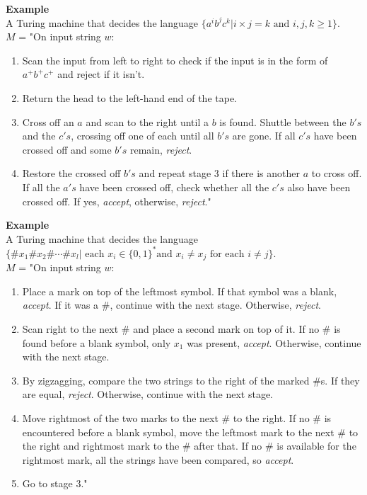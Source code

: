 \documentclass[11pt]{article}
\begin{document}
\begin{mdframed}[backgroundcolor=light-blue]
\textbf{Example}\\
A Turing machine that decides the language $\{a^ib^jc^k|i \times j=k
\text{ and } i,j,k \geq 1\}$.\\
$M$ = "On input string $w$:
\begin{enumerate}
\item Scan the input from left to right to check if the input is in
  the form of $a^+b^+c^+$ and reject if it isn't.
\item Return the head to the left-hand end of the tape.
\item Cross off an $a$ and scan to the right until a $b$ is
  found. Shuttle between the $b's$ and the $c's$, crossing off one of
  each until all $b's$ are gone. If all $c's$ have been crossed off
  and some $b's$ remain, \emph{reject}.
\item Restore the crossed off $b's$ and repeat stage 3 if there is
  another $a$ to cross off. If all the $a's$ have been crossed off,
  check whether all the $c's$ also have been crossed off. If yes,
  \emph{accept}, otherwise, \emph{reject}."
\end{enumerate}
\end{mdframed}

\begin{mdframed}[backgroundcolor=light-blue]
\textbf{Example}\\
A Turing machine that decides the language\\
$\{\#x_1\#x_2\#\cdots\#x_l | \text{ each } x_i \in \{0,1\}^* \text{
  and } x_i \neq x_j \text{ for each } i \neq j \}$.\\
$M$ = "On input string $w$:
\begin{enumerate}
\item Place a mark on top of the leftmost symbol. If that symbol was a
  blank, \emph{accept}. If it was a \#, continue with the next
  stage. Otherwise, \emph{reject}.
\item Scan right to the next \# and place a second mark on top of
  it. If no \# is found before a blank symbol, only $x_1$ was present,
  \emph{accept}. Otherwise, continue with the next stage.
\item By zigzagging, compare the two strings to the right of the marked
  \#s. If they are equal, \emph{reject}. Otherwise, continue with the
  next stage.
\item Move rightmost of the two marks to the next \# to the right. If
  no \# is encountered before a blank symbol, move the leftmost mark to
  the next \# to the right and rightmost mark to the \# after that. If
  no \# is available for the rightmost mark, all the strings have been
  compared, so \emph{accept}.
\item Go to stage 3."
\end{enumerate}
\end{mdframed}
\end{document}
